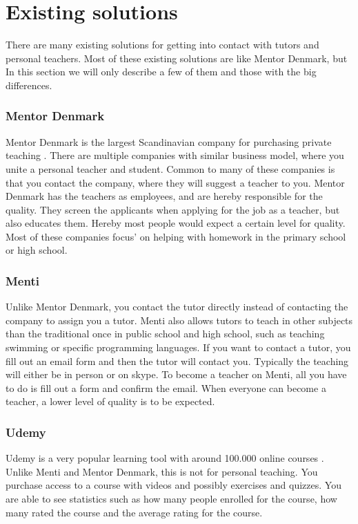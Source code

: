 \section{Existing solutions}
There are many existing solutions for getting into contact with tutors and personal teachers.
Most of these existing solutions are like Mentor Denmark, but 
In this section we will only describe a few of them and those with the big differences.

\subsubsection{Mentor Denmark}
Mentor Denmark is the largest Scandinavian company for purchasing private teaching \cite{skandinaviens-stoeste-lektiefirma}.
There are multiple companies with similar business model, where you unite a personal teacher and student. 
Common to many of these companies is that you contact the company, where they will suggest a teacher to you.
Mentor Denmark has the teachers as employees, and are hereby responsible for the quality. 
They screen the applicants when applying for the job as a teacher, but also educates them. 
Hereby most people would expect a certain level for quality.
Most of these companies focus' on helping with homework in the primary school or high school.

\subsubsection{Menti}
Unlike Mentor Denmark, you contact the tutor directly instead of contacting the company to assign you a tutor.
Menti also allows tutors to teach in other subjects than the traditional once in public school and high school, such as teaching swimming or specific programming languages.
If you want to contact a tutor, you fill out an email form and then the tutor will contact you.
Typically the teaching will either be in person or on skype. 
To become a teacher on Menti, all you have to do is fill out a form and confirm the email.
When everyone can become a teacher, a lower level of quality is to be expected.

\subsubsection{Udemy}
Udemy is a very popular learning tool with around 100.000 online courses \cite{udemy}.
Unlike Menti and Mentor Denmark, this is not for personal teaching. 
You purchase access to a course with videos and possibly exercises and quizzes. 
You are able to see statistics such as how many people enrolled for the course, how many rated the course and the average rating for the course.

